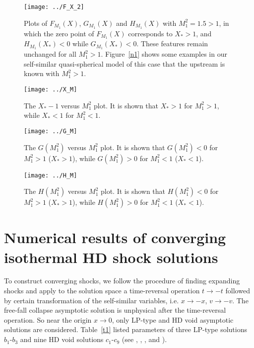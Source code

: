 \documentclass[fleqn,usenatbib]{mnras}
\begin{document}
\begin{figure}
\centering
\texttt{[image: ../F\_X\_2]}
\caption{Plots of $F_{M_{1}}(X)$, $G_{M_{1}}(X)$ and $H_{M_{1}}(X)$ with $M_{1}^{2}=1.5>1$, in which the zero point of $F_{M_{1}}(X)$ corresponds to $X_{*}>1$, and $H_{M_{1}}(X_{*})<0$ while $G_{M_{1}}(X_{*})<0$. These features remain unchanged for all $M_{1}^{2}>1$. Figure~\ref{n1} shows some examples in our self-similar quasi-spherical model of this case that the upstream is known with $M_{1}^{2}>1$.}
\label{2}
\end{figure}

\begin{figure}
\centering
\texttt{[image: ../X\_M]}
\caption{The $X_{*}-1$ versus $M_{1}^{2}$ plot. It is shown that $X_{*}>1$ for $M_{1}^{2}>1$, while $X_{*}<1$ for $M_{1}^{2}<1$.}
\label{3}
\end{figure}

\begin{figure}
\centering
\texttt{[image: ../G\_M]}
\caption{The $G(M_{1}^{2})$ versus $M_{1}^{2}$ plot. It is shown that $G(M_{1}^{2})<0$ for $M_{1}^{2}>1$ ($X_{*}>1$), while $G(M_{1}^{2})>0$ for $M_{1}^{2}<1$ ($X_{*}<1$).}
\label{4}
\end{figure}

\begin{figure}
\centering
\texttt{[image: ../H\_M]}
\caption{The $H(M_{1}^{2})$ versus $M_{1}^{2}$ plot. It is shown that $H(M_{1}^{2})<0$ for $M_{1}^{2}>1$ ($X_{*}>1$), while $H(M_{1}^{2})>0$ for $M_{1}^{2}<1$ ($X_{*}<1$).}
\label{5}
\end{figure}

\section{Numerical results of converging isothermal HD shock solutions}
\label{s2}
To construct converging shocks, we follow the procedure of finding expanding shocks and apply to the solution space a time-reversal operation $t\rightarrow-t$ followed by certain transformation of the self-similar variables, i.e. $x\rightarrow-x$, $v\rightarrow-v$. The free-fall collapse asymptotic solution is unphysical after the time-reversal operation. So near the origin $x\rightarrow 0$, only LP-type and HD void asymptotic solutions are considered. Table~\ref{t1} listed parameters of three LP-type solutions $b_{1}$-$b_{3}$ and nine HD void solutions $c_{1}$-$c_{9}$ (see \citet{larson1969numerical}, \citet{penston1969dynamics}, \citet{whitworth1985self}, \citet{lou2004envelope} and \citet{lou2009dynamic}).
\end{document}
